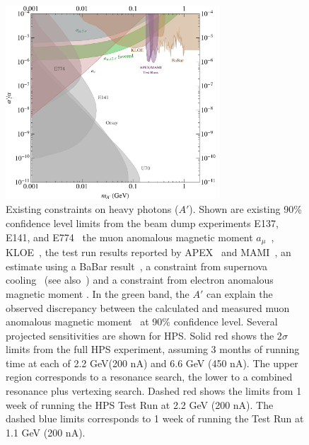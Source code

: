 \begin{figure}[h]
\centering
\includegraphics[width=0.7\textwidth]{limit_g-2_electron.pdf} 
\caption{ Existing constraints on heavy photons ($A'$). 
Shown are existing 90\% confidence level limits from the beam dump experiments 
E137, E141, and E774~\cite{Bjorken:2009mm,Bjorken:1988as,Riordan:1987aw,Bross:1989mp} 
the muon anomalous magnetic moment $a_\mu$~\cite{Pospelov:2008zw},  
KLOE~\cite{Collaboration:2011zc}, 
the test run results reported by APEX~\cite{Abrahamyan:2011gv} and MAMI~\cite{Merkel:2011ze}, 
an estimate using a BaBar result~\cite{Bjorken:2009mm,Reece:2009un,Aubert:2009cp},
a constraint from supernova cooling~\cite{Bjorken:2009mm} (see also~\cite{Dent:2012mx}) and a constraint from electron anomalous magnetic moment \cite{endo:g2e}.
In the green band, the $A'$ can explain the observed discrepancy between the
calculated and measured muon anomalous magnetic moment~\cite{Pospelov:2008zw} 
at 90\% confidence level.
Several projected sensitivities are shown for HPS. Solid red shows the 2$\sigma$ limits from the full HPS experiment, assuming 3 months of running time at each of 2.2 GeV(200 nA) and 6.6 GeV (450 nA). The upper region corresponds to a resonance search, the lower to a combined resonance plus vertexing search. Dashed red shows the limits from 1 week of running the HPS Test Run at 2.2 GeV (200 nA). The dashed blue limits corresponds to 1 week of running the Test Run at 1.1 GeV (200 nA).  
}
\label{fig:hspaw-heavy-A'}
\end{figure}

